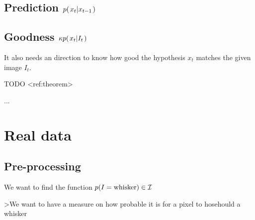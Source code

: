 \subsection{Prediction $p{(\left. x_t \middle\vert x_{t-1} \right.)}$}


\subsection{Goodness $\kappa p{(\left. x_t \middle\vert I_t \right.)}$}
It also needs an direction to know how good the hypothesis $x_t$ matches the given image $I_t$.

TODO <ref:theorem>

...



\section{Real data}
    \subsection{Pre-processing}

    We want to find the function $p{(I=\text{whisker})}\in\mathcal{I}$

    >We want to have a measure on how probable it is for a pixel to hosehould a whisker





